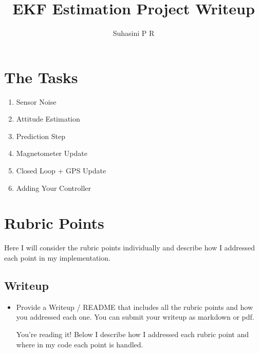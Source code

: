 \documentclass{article}
\begin{document}
\title{EKF Estimation Project Writeup}
\author{Suhasini P R}    

\maketitle
\section{The Tasks}
\begin{enumerate}
\item Sensor Noise
\item Attitude Estimation
\item Prediction Step
\item Magnetometer Update
\item Closed Loop + GPS Update
\item Adding Your Controller
\end{enumerate}
\section{Rubric Points}
Here I will consider the rubric points individually and describe how I addressed each point in my implementation.

\subsection{Writeup}
\begin{itemize}
\item Provide a Writeup / README that includes all the rubric points and how you addressed each one. You can submit your writeup as markdown or pdf.


You're reading it! Below I describe how I addressed each rubric point and where in my code each point is handled.
\end{itemize}
\end{document}
